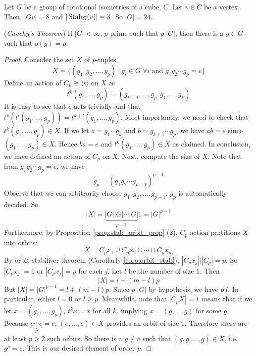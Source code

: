 \documentclass[10pt, a4paper, twoside]{report}
\begin{document}
\begin{example}
    Let \(G\) be a group of rotational isometries of a cube, \(C\). Let \(v\in C\) be a vertex. Then, \(|Gv|=8\) and \(|\operatorname{Stab}_G(v)|=3\). So \(|G|=24\).
    \label{eg:cube_rot}
\end{example}
\begin{theorem}
    (\emph{Cauchy's Theorem}) If \(|G|<\infty\), \(p\) prime such that \(p\big||G|\), then there is a \(g\in G\) such that \(o(g)=p\).
    \label{thm:group_cauchy}
\end{theorem}
\begin{proof}
    Consider the set \(X\) of \(p\)-tuples 
    \[X=\{(g_1,g_2,\ldots,g_p)\:|\:g_i\in G\;\forall i\text{  and  }g_1g_2\cdots g_p=e\}\]
    Define an action of \(C_p\cong\langle t\rangle\) on \(X\) as 
    \[t^k(g_1,\ldots,g_p)=(g_{k+1},\ldots,g_p,g_1,\ldots,g_k)\]
    It is easy to see that \(e\) acts trivially and that \(t^k(t^l(g_1,\ldots,g_p))=t^{k+l}(g_1,\ldots,g_p)\). Most importantly, we need to check that \(t^k(g_1,\ldots,g_p)\in X\). If we let \(a=g_1\cdots g_k\) and \(b=g_{k+1}\cdots g_p\), we have \(ab=e\) since \((g_1,\ldots,g_p)\in X\). Hence \(ba=e\) and \(t^k(g_1,\ldots,g_p)\in X\) as claimed. In conclusion, we have defined an action of \(C_p\) on \(X\). Next, compute the size of \(X\). Note that from \(g_1g_2\cdots g_p=e\), we have 
    \[g_p=(g_1g_2\cdots g_{p-1})^{p-1}\]
    Observe that we can arbitrarily choose \(g_1,g_2,\ldots,g_{p-1}\), \(g_p\) is automatically decided. So
    \[|X|=\underbrace{|G||G|\cdots|G|}_{p-1}1=|G|^{p-1}\]
    Furthermore, by Proposition \ref{prop:stab_orbit_prop} (2), \(C_p\) action partitions \(X\) into orbits:
    \[X=C_px_1\cup C_px_2\cup\cdots\cup C_px_m\]
    By orbit-stabiliser theorem (Corollarly \ref{coro:orbit_stab}), \(|C_px_j|\big||C_p|=p\). So \(|C_px_j|=1\) or \(|C_px_j|=p\) for each \(j\). Let \(l\) be the number of size \(1\). Then 
    \[|X|=l+(m-l)p\]
    But \(|X|=|G|^{p-1}=l+(m-l)p\). Since \(p\big||G|\) by hypothesis, we have \(p|l\). In particular, either \(l=0\) or \(l\geq p\). Meanwhile, note that \(|C_pX|=1\) means that if we let \(x=(g_1,\ldots,g_p)\), \(t^kx=x\) for all \(k\), implying \(x=(g,\ldots,g)\) for some \(g\). Because \(\underbrace{e\cdots e}_{p}=e\), \((e,\ldots,e)\in X\) provides an orbit of size 1. Therefore there are at least \(p\geq 2\) such orbits. So there is a \(g\neq e\) such that \((g,g,\ldots,g)\in X\), i.e. \(g^p=e\). This is our desired element of order \(p\).
\end{proof}
\end{document}
